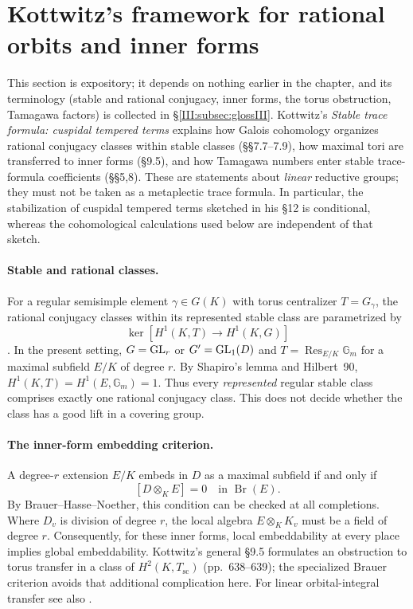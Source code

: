 \section{Kottwitz's framework for rational orbits and inner forms}
\label{III:sec:kottwitz}
This section is expository; it depends on nothing earlier in the chapter, and its terminology (stable and rational conjugacy, inner forms, the torus obstruction, Tamagawa factors) is collected in \S\ref{III:subsec:glossIII}.
Kottwitz's \emph{Stable trace formula: cuspidal tempered terms}
\cite{Kot84} explains how Galois cohomology organizes rational
conjugacy classes within stable classes (\S\S7.7--7.9), how maximal
tori are transferred to inner forms (\S9.5), and how Tamagawa
numbers enter stable trace-formula coefficients (\S\S5,8).
These are statements about \emph{linear} reductive groups; they
must not be taken as a metaplectic trace formula. In particular,
the stabilization of cuspidal tempered terms sketched in his \S12
is conditional, whereas the cohomological calculations used below
are independent of that sketch.

\paragraph{Stable and rational classes.}
For a regular semisimple element $\gamma\in G(K)$ with torus
centralizer $T=G_\gamma$, the rational conjugacy classes within
its represented stable class are parametrized by
\begin{equation}\label{III:eq:kottwitz-rational}
\ker\!\left[H^1(K,T)\longrightarrow H^1(K,G)\right]
\end{equation}
\cite[\S7.7]{Kot84}. In the present setting,
$G=\operatorname{GL}_r$ or $G'=\operatorname{GL}_1(D)$ and
$T=\operatorname{Res}_{E/K}\mathbb G_m$ for a maximal subfield
$E/K$ of degree $r$. By Shapiro's lemma and Hilbert~90,
$H^1(K,T)=H^1(E,\mathbb G_m)=1$.
Thus every \emph{represented} regular stable class comprises
exactly one rational conjugacy class. This does not decide
whether the class has a good lift in a covering group.

\paragraph{The inner-form embedding criterion.}
A degree-$r$ extension $E/K$ embeds in $D$ as a maximal
subfield if and only if
\begin{equation}\label{III:eq:brauer-embedding}
[D\otimes_K E]=0\quad\text{in }\operatorname{Br}(E).
\end{equation}
By Brauer--Hasse--Noether, this condition can be checked at all
completions. Where $D_v$ is division of degree $r$, the local
algebra $E\otimes_K K_v$ must be a field of degree $r$.
Consequently, for these inner forms, local embeddability at every
place implies global embeddability. Kottwitz's general \S9.5
formulates an obstruction to torus transfer in a class of
$H^2(K,T_{\mathrm{sc}})$ (pp.~638--639); the specialized Brauer
criterion avoids that additional complication here. For linear
orbital-integral transfer see also \cite{Coh18}.

